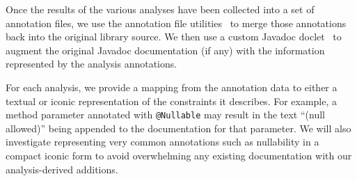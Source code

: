 Once the results of the various analyses have been collected into a set of
annotation files, we use the annotation file utilities~\cite{AFU} to merge
those annotations back into the original library source. We then use a custom
Javadoc doclet~\cite{doclet} to augment the original Javadoc documentation (if
any) with the information represented by the analysis annotations.

For each analysis, we provide a mapping from the annotation data to either a
textual or iconic representation of the constraints it describes. For example,
a method parameter annotated with \texttt{@Nullable} may result in the text
``(null allowed)'' being appended to the documentation for that parameter. We
will also investigate representing very common annotations such as nullability
in a compact iconic form to avoid overwhelming any existing documentation with
our analysis-derived additions.
